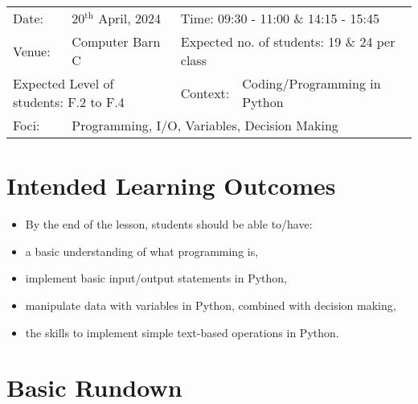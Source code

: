 \documentclass{article}
\def\s{students }
\begin{document}
\begin{center}

\begin{tabular}{lllll}
Date: & 20$^{\text{th}}$ April, 2024 & \multicolumn{3}{l}{Time: 09:30 - 11:00 \& 14:15 - 15:45} \\
Venue: & Computer Barn C & \multicolumn{3}{l}{Expected no. of students: 19 \& 24 per class} \\
\multicolumn{2}{l}{Expected Level of students: F.2 to F.4} & Context: & Coding/Programming in Python &\\
Foci: & \multicolumn{4}{l}{Programming, I/O, Variables, Decision Making}\\
\end{tabular}
\end{center}

\section*{Intended Learning Outcomes}

\begin{itemize}
	\item[] By the end of the lesson, \s should be able to/have:
	\item a basic understanding of what programming is,
	\item implement basic input/output statements in Python,
	\item manipulate data with variables in Python, combined with decision making,
	\item the skills to implement simple text-based operations in Python.
\end{itemize}


\section*{Basic Rundown}
\end{document}
